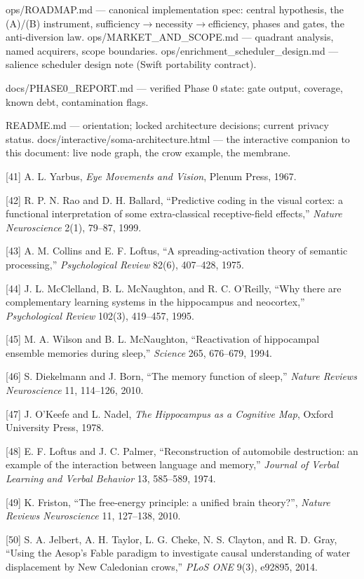 ops/ROADMAP.md --- canonical implementation spec: central hypothesis, the (A)/(B) instrument, sufficiency\(\rightarrow\)necessity\(\rightarrow\)efficiency, phases and gates, the anti-diversion law. ops/MARKET\_AND\_SCOPE.md --- quadrant analysis, named acquirers, scope boundaries. ops/enrichment\_scheduler\_design.md --- salience scheduler design note (Swift portability contract).

docs/PHASE0\_REPORT.md --- verified Phase 0 state: gate output, coverage, known debt, contamination flags.

README.md --- orientation; locked architecture decisions; current privacy status. docs/interactive/soma-architecture.html --- the interactive companion to this document: live node graph, the crow example, the membrane.

{[}41{]} A. L. Yarbus, \emph{Eye Movements and Vision}, Plenum Press, 1967.

{[}42{]} R. P. N. Rao and D. H. Ballard, ``Predictive coding in the visual cortex: a functional interpretation of some extra-classical receptive-field effects,'' \emph{Nature Neuroscience} 2(1), 79--87, 1999.

{[}43{]} A. M. Collins and E. F. Loftus, ``A spreading-activation theory of semantic processing,'' \emph{Psychological Review} 82(6), 407--428, 1975.

{[}44{]} J. L. McClelland, B. L. McNaughton, and R. C. O'Reilly, ``Why there are complementary learning systems in the hippocampus and neocortex,'' \emph{Psychological Review} 102(3), 419--457, 1995.

{[}45{]} M. A. Wilson and B. L. McNaughton, ``Reactivation of hippocampal ensemble memories during sleep,'' \emph{Science} 265, 676--679, 1994.

{[}46{]} S. Diekelmann and J. Born, ``The memory function of sleep,'' \emph{Nature Reviews Neuroscience} 11, 114--126, 2010.

{[}47{]} J. O'Keefe and L. Nadel, \emph{The Hippocampus as a Cognitive Map}, Oxford University Press, 1978.

{[}48{]} E. F. Loftus and J. C. Palmer, ``Reconstruction of automobile destruction: an example of the interaction between language and memory,'' \emph{Journal of Verbal Learning and Verbal Behavior} 13, 585--589, 1974.

{[}49{]} K. Friston, ``The free-energy principle: a unified brain theory?'', \emph{Nature Reviews Neuroscience} 11, 127--138, 2010.

{[}50{]} S. A. Jelbert, A. H. Taylor, L. G. Cheke, N. S. Clayton, and R. D. Gray, ``Using the Aesop's Fable paradigm to investigate causal understanding of water displacement by New Caledonian crows,'' \emph{PLoS ONE} 9(3), e92895, 2014.

